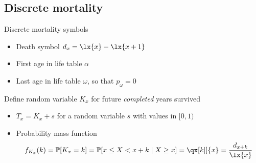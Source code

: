 \subsection{Discrete mortality}

Discrete mortality symbols
\begin{itemize}
\item Death symbol $d_x = \lx{x} - \lx{x + 1}$
\item First age in life table $\alpha$
\item Last age in life table $\omega$, so that $p_{\omega} = 0$
\end{itemize}

Define random variable $K_x$ for future \emph{completed} years survived
\begin{itemize}
\item $T_x = K_x + s$ for a random variable $s$ with values in $[0,1)$
\item Probability mass function
\begin{equation*}
f_{K_x}(k) = \mathbb{P}[K_x = k] = \mathbb{P}[x\leq X < x + k\mid X\geq x] = \qx[k|]{x} = \frac{d_{x + k}}{\lx{x}}
\end{equation*}
\end{itemize}